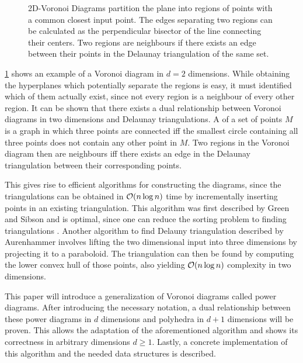 \begin{figure}[Htb]
    \caption{2D-Voronoi Diagrams partition the plane into regions of points with a common closest input point. The edges separating two regions can be calculated as the perpendicular bisector of the line connecting their centers. Two regions are neighbours if there exists an edge between their points in the Delaunay triangulation of the same set.}
    \label{fig:voronoi}
\end{figure}

\cref{fig:voronoi} shows an example of a Voronoi diagram in $d = 2$ dimensions.
While obtaining the hyperplanes which potentially separate the regions is easy, it must identified which of them actually exist, since not every region is a neighbour of every other region.
It can be shown \cite{aurenhammer1991voronoi} that there exists a dual relationship between Voronoi diagrams in two dimensions and Delaunay triangulations.
A  of a set of points $M$ is a graph in which three points are connected iff the smallest circle containing all three points does not contain any other point in $M$.
Two regions in the Voronoi diagram then are neighbours iff there exists an edge in the Delaunay triangulation between their corresponding points.

This gives rise to efficient algorithms for constructing the diagrams, since the triangulations can be obtained in $\mathcal{O}(n \log n)$ time by incrementally inserting points in an existing triangulation.
This algorithm was first described by Green and Sibson \cite{green1978computing} and is optimal, since one can reduce the sorting problem to finding triangulations \cite{aurenhammer1991voronoi}.
Another algorithm to find Delauny triangulation described by Aurenhammer involves lifting the two dimensional input into three dimensions by projecting it to a paraboloid.
The triangulation can then be found by computing the lower convex hull of those points, also yielding $\mathcal{O}(n \log n)$ complexity in two dimensions.

This paper will introduce a generalization of Voronoi diagrams called power diagrams.
After introducing the necessary notation, a dual relationship between these power diagrams in $d$ dimensions and polyhedra in $d+1$ dimensions will be proven.
This allows the adaptation of the aforementioned algorithm and shows its correctness in arbitrary dimensions $d \geq 1$.
Lastly, a concrete implementation of this algorithm and the needed data structures is described.

